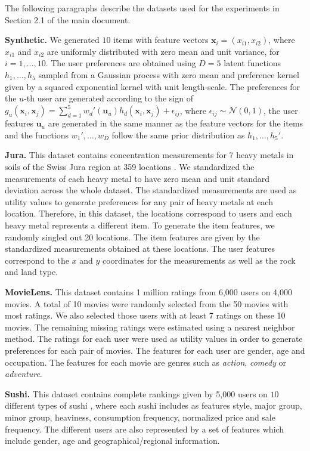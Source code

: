 \documentclass{article}
\begin{document}
The following paragraphs describe the datasets used for the experiments in Section 2.1 of the main document.

{\bf Synthetic.} We generated $10$ items with feature vectors $\mathbf{x}_i=(x_{i1},x_{i2})$,
where $x_{i1}$ and $x_{i2}$ are uniformly distributed with zero mean and unit variance, for $i = 1,\ldots,10$.
The user preferences are obtained
using $D=5$ latent functions $h_1,\ldots,h_5$ sampled from a Gaussian process
with zero mean and preference kernel given by a squared exponential kernel with unit length-scale.
The preferences for the $u$-th user are generated according to the sign of
$g_u(\mathbf{x}_i, \mathbf{x}_j) = \sum_{d=1}^5 w_{d}'(\mathbf{u}_u) h_d(\mathbf{x}_i, \mathbf{x}_j) + \epsilon_{ij}$,
where $\epsilon_{ij} \sim \mathcal{N}(0,1)$, the user features $\mathbf{u}_u$ are
generated in the same manner as the feature vectors for the items and the functions $w_{1}',\ldots,w_{D}$
follow the same prior distribution as $h_1,\ldots,h_5'$.

{\bf Jura.} 
This dataset contains concentration measurements for 7 heavy metals in soils of the Swiss Jura region at 359 locations \citep{Atteia1994315,Webster1994}.
We standardized the measurements of each heavy metal to have zero mean and unit standard deviation across the whole dataset.
The standardized measurements are used as utility values to generate preferences for any pair of heavy
metals at each location. Therefore, in this dataset, the locations correspond to users and each heavy metal
represents a different item. To generate the item features, we randomly singled out 20 locations.
The item features are given by the standardized measurements obtained at these locations. 
The user features correspond to the $x$ and $y$ coordinates for the measurements as well as the rock and land type.

{\bf MovieLens.} 
This dataset contains 1 million ratings from 6,000 users on 4,000 movies.
A total of 10 movies were randomly selected from the 50 movies with most ratings.
We also selected those users with at least 7 ratings on these 10 movies.
The remaining missing ratings were estimated using a nearest neighbor method.
The ratings for each user were used as utility values in order to generate preferences for each pair of movies.
The features for each user are gender, age and occupation. The features for each movie are genres
such as \emph{action}, \emph{comedy} or \emph{adventure}.

{\bf Sushi.}
This dataset contains complete rankings given by 5,000 users on $10$ different types of sushi \citep{Kamishima05},
where each sushi includes as features style, major group, minor group, heaviness, consumption
frequency, normalized price and sale frequency. The different users are also represented by
a set of features which include gender, age and geographical/regional information.
\end{document}
